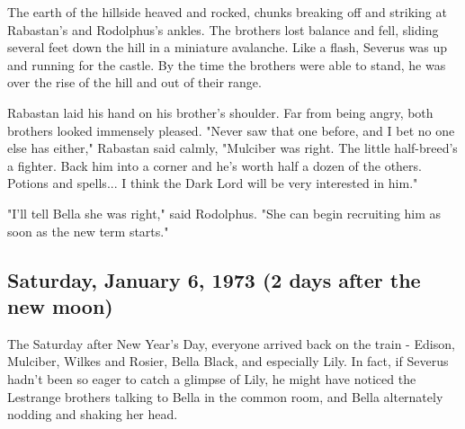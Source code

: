 \documentclass[a4paper,11pt]{article}
\begin{document}
The earth of the hillside heaved and rocked, chunks breaking off and striking at Rabastan's and Rodolphus's ankles. The brothers lost balance and fell, sliding several feet down the hill in a miniature avalanche. Like a flash, Severus was up and running for the castle. By the time the brothers were able to stand, he was over the rise of the hill and out of their range.

Rabastan laid his hand on his brother's shoulder. Far from being angry, both brothers looked immensely pleased. "Never saw that one before, and I bet no one else has either," Rabastan said calmly, "Mulciber was right. The little half-breed's a fighter. Back him into a corner and he's worth half a dozen of the others. Potions and spells... I think the Dark Lord will be very interested in him."

"I'll tell Bella she was right," said Rodolphus. "She can begin recruiting him as soon as the new term starts."

\subsection{Saturday, January 6, 1973 (2 days after the new moon)}

The Saturday after New Year's Day, everyone arrived back on the train - Edison, Mulciber, Wilkes and Rosier, Bella Black, and especially Lily. In fact, if Severus hadn't been so eager to catch a glimpse of Lily, he might have noticed the Lestrange brothers talking to Bella in the common room, and Bella alternately nodding and shaking her head.
\end{document}
